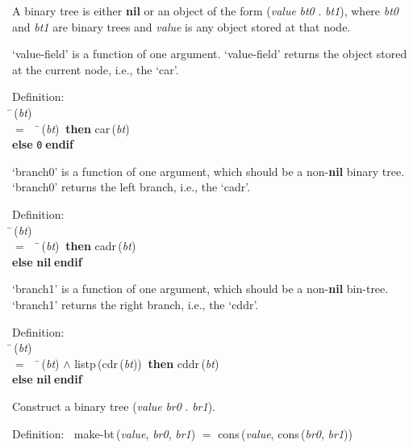  A binary tree is either {\bf{nil}} or an object of the form ({\it{value\/}} {\it{bt0\/}} . {\it{bt1\/}}),
 where {\it{bt0\/}} and {\it{bt1\/}} are binary trees and {\it{value\/}} is any object stored at
 that node.

 `value-field' is a function of one argument.  `value-field' returns the
 object stored at the current node, i.e., the `car'.
\begin{tabbing}{\sc Definition}: \\  
\=\,({\it{bt\/}}) \\ 
$=$$\;\;\;\;$\=\,({\it{bt\/}})$\;\;${\bf then }{\rm{car}}\,({\it{bt\/}}) \\ 
{\bf else }{\tt{0}}$\;${\bf  endif}\-\-
\end{tabbing}

 `branch0' is a function of one argument, which should be a non-{\bf{nil}} binary
 tree. `branch0' returns the left branch, i.e., the `cadr'.
\begin{tabbing}{\sc Definition}: \\  
\=\,({\it{bt\/}}) \\ 
$=$$\;\;\;\;$\=\,({\it{bt\/}})$\;\;${\bf then }{\rm{cadr}}\,({\it{bt\/}}) \\ 
{\bf else }{\bf{nil}}$\;${\bf  endif}\-\-
\end{tabbing}

 `branch1' is a function of one argument, which should be a non-{\bf{nil}} bin-tree.
 `branch1' returns the right branch, i.e., the `cddr'.
\begin{tabbing}{\sc Definition}: \\  
\=\,({\it{bt\/}}) \\ 
$=$$\;\;\;\;$\=\,({\it{bt\/}}) $\wedge$ {\rm{listp}}\,({\rm{cdr}}\,({\it{bt\/}}))$\;\;${\bf then }{\rm{cddr}}\,({\it{bt\/}}) \\ 
{\bf else }{\bf{nil}}$\;${\bf  endif}\-\-
\end{tabbing}

 Construct a binary tree ({\it{value\/}} {\it{br0\/}} . {\it{br1\/}}).
\begin{tabbing}{\sc Definition}:$\;\;$
{\rm{make-bt}}\,({\it{value\/}}, {\it{br0\/}}, {\it{br1\/}}) $=$ {\rm{cons}}\,({\it{value\/}}, {\rm{cons}}\,({\it{br0\/}}, {\it{br1\/}}))
\end{tabbing}

